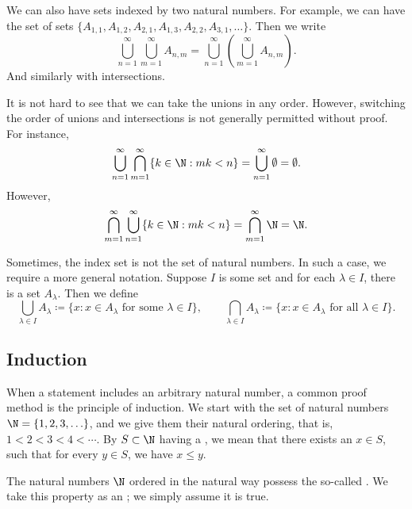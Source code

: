 We can also have sets indexed by two natural numbers.  For example, we can have
the set of sets
$\{ A_{1,1}, A_{1,2}, A_{2,1}, A_{1,3}, A_{2,2}, A_{3,1}, \ldots \}$.  Then
we write 
\begin{equation*}
\bigcup_{n=1}^\infty \bigcup_{m=1}^\infty A_{n,m}
=
\bigcup_{n=1}^\infty \left( \bigcup_{m=1}^\infty A_{n,m} \right) .
\end{equation*}
And similarly with intersections.

It is not hard to see that we can take the unions in any order.  However,
switching the order of unions and intersections is not generally permitted without proof.
For instance,
\begin{equation*}
\bigcup_{n=1}^\infty
\bigcap_{m=1}^\infty
\{ k \in \N : mk < n \}
=
\bigcup_{n=1}^\infty \emptyset = \emptyset .
\end{equation*}
However,
\begin{equation*}
\bigcap_{m=1}^\infty
\bigcup_{n=1}^\infty
\{ k \in \N : mk < n \}
=
\bigcap_{m=1}^\infty
\N
=
\N.
\end{equation*}

Sometimes, the index set is not the set of natural numbers.  In such a case, we
require a more general notation.  Suppose $I$ is some set and for each $\lambda \in
I$, there is a set $A_\lambda$.  Then we define
\begin{equation*}
\bigcup_{\lambda \in I} A_\lambda \coloneqq \{ x : x \in A_\lambda \text{ for some }
\lambda \in I
\} ,
\qquad
\bigcap_{\lambda \in I} A_\lambda \coloneqq \{ x : x \in A_\lambda \text{ for all }
\lambda \in I
\} .
\end{equation*}

\subsection{Induction}

When a statement includes an arbitrary natural number,
a common proof method is the principle of induction.  
We start with the set of natural numbers $\N = \{ 1,2,3,\ldots \}$, and we
give them their natural ordering, 
that is, $1 < 2 < 3 < 4 < \cdots$.
By $S \subset \N$ having a \emph{}, we mean that
there exists an $x \in S$,
such that for every
$y \in S$, we have $x \leq y$.

The natural numbers $\N$ ordered in the natural way
possess the so-called \emph{}.
We take this property
as an ; we simply assume it is true.

